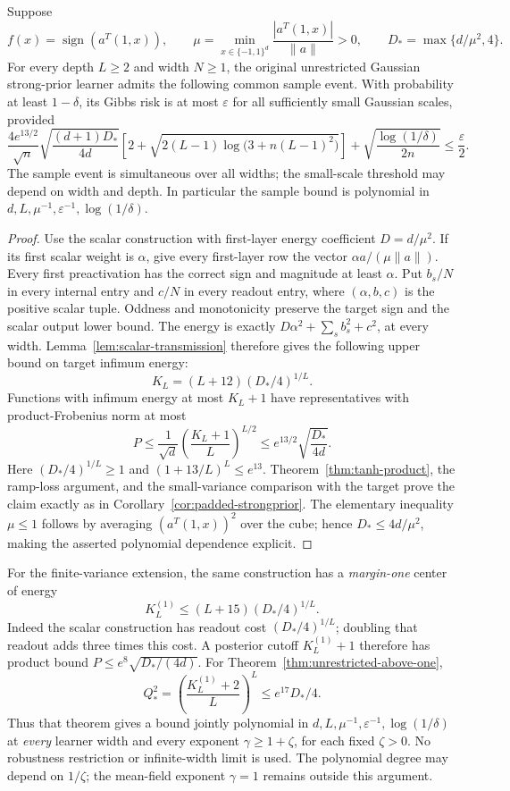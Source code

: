 \begin{corollary}
\label{cor:linear-threshold}
Suppose
\[
 f(x)=\operatorname{sign}(a^T(1,x)),\qquad
 \mu=\min_{x\in\{-1,1\}^d}\frac{|a^T(1,x)|}{\|a\|}>0,
 \qquad D_* =\max\{d/\mu^2,4\}.
\]
For every depth $L\ge2$ and width $N\ge1$, the original unrestricted
Gaussian strong-prior learner admits the following common sample event.
With probability at least $1-\delta$, its Gibbs risk is at most
$\varepsilon$ for all sufficiently small Gaussian scales, provided
\[
 \frac{4 e^{13/2}}{\sqrt n}
 \sqrt{\frac{(d+1)D_*}{4d}}
 \left[2+\sqrt{2(L-1)\log\bigl(3+n(L-1)^2\bigr)}\right]
 +\sqrt{\frac{\log(1/\delta)}{2n}}
 \le\frac\varepsilon2.
\]
The sample event is simultaneous over all widths; the small-scale threshold
may depend on width and depth. In particular the sample bound is polynomial
in $d,L,\mu^{-1},\varepsilon^{-1},\log(1/\delta)$.
\end{corollary}

\begin{proof}
Use the scalar construction with first-layer energy coefficient
$D=d/\mu^2$. If its first scalar weight is $\alpha$, give every first-layer
row the vector $\alpha a/(\mu\|a\|)$. Every first preactivation has the
correct sign and magnitude at least $\alpha$. Put $b_s/N$ in every internal
entry and $c/N$ in every readout entry, where $(\alpha,b,c)$ is the positive
scalar tuple. Oddness and monotonicity preserve the target sign and the
scalar output lower bound. The energy is exactly
$D\alpha^2+\sum_s b_s^2+c^2$, at every width.
Lemma~\ref{lem:scalar-transmission} therefore gives the following upper bound on target infimum energy:
\[
 K_L=(L+12)(D_*/4)^{1/L}.
\]
Functions with infimum energy at most $K_L+1$ have representatives with
product-Frobenius norm at most
\[
 P\le\frac1{\sqrt d}
       \left(\frac{K_L+1}{L}\right)^{L/2}
 \le e^{13/2}\sqrt{\frac{D_*}{4d}}.
\]
Here $(D_*/4)^{1/L}\ge1$ and $(1+13/L)^L\le e^{13}$.
Theorem~\ref{thm:tanh-product}, the ramp-loss argument, and the
small-variance comparison with the target prove the claim exactly as in
Corollary~\ref{cor:padded-strongprior}. The elementary inequality
$\mu\le1$ follows by averaging $(a^T(1,x))^2$ over the cube; hence
$D_*\le4d/\mu^2$, making the asserted polynomial dependence explicit.
\end{proof}

For the finite-variance extension, the same construction has a
\emph{margin-one} center of energy
\[
 K_L^{(1)}\le(L+15)(D_*/4)^{1/L}.
\]
Indeed the scalar construction has readout cost $(D_*/4)^{1/L}$;
doubling that readout adds three times this cost. A posterior cutoff
$K_L^{(1)}+1$ therefore has product bound
$P\le e^8\sqrt{D_*/(4d)}$. For Theorem~\ref{thm:unrestricted-above-one},
\[
 Q_*^2=\left(\frac{K_L^{(1)}+2}{L}\right)^L
 \le e^{17}D_*/4.
\]
Thus that theorem gives a bound jointly polynomial in
$d,L,\mu^{-1},\varepsilon^{-1},\log(1/\delta)$ at \emph{every} learner width
and every exponent $\gamma\ge1+\zeta$, for each fixed $\zeta>0$.
No robustness restriction or infinite-width limit is used. The polynomial
degree may depend on $1/\zeta$; the mean-field exponent $\gamma=1$
remains outside this argument.

